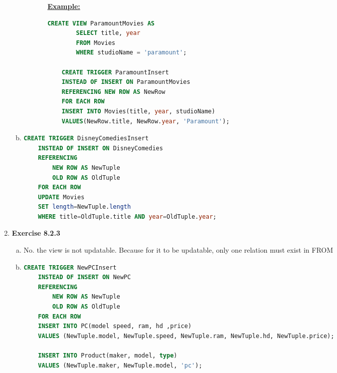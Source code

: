 \documentclass[12pt]{article}
\begin{document}
\begin{enumerate}[1.]
\begin{enumerate}[a)]
\begin{itemize}
\begin{itemize}
                \bigskip

                \underline{\textbf{Example:}}

    \begin{lstlisting}[language=SQL]
    CREATE VIEW ParamountMovies AS
        SELECT title, year
        FROM Movies
        WHERE studioName = 'paramount';

    CREATE TRIGGER ParamountInsert
    INSTEAD OF INSERT ON ParamountMovies
    REFERENCING NEW ROW AS NewRow
    FOR EACH ROW
    INSERT INTO Movies(title, year, studioName)
    VALUES(NewRow.title, NewRow.year, 'Paramount');
    \end{lstlisting}

            \end{itemize}
        \end{itemize}

        \item

    \begin{lstlisting}[language=SQL]
    CREATE TRIGGER DisneyComediesInsert
    INSTEAD OF INSERT ON DisneyComedies
    REFERENCING
        NEW ROW AS NewTuple
        OLD ROW AS OldTuple
    FOR EACH ROW
    UPDATE Movies
    SET length=NewTuple.length
    WHERE title=OldTuple.title AND year=OldTuple.year;
    \end{lstlisting}

    \end{enumerate}

    \item \textbf{Exercise 8.2.3}

    \bigskip

    \begin{enumerate}[a)]
        \item No. the view is not updatable. Because for it to be updatable,
        only one relation must exist in FROM
        \item

    \begin{lstlisting}[language=SQL]
    CREATE TRIGGER NewPCInsert
    INSTEAD OF INSERT ON NewPC
    REFERENCING
        NEW ROW AS NewTuple
        OLD ROW AS OldTuple
    FOR EACH ROW
    INSERT INTO PC(model speed, ram, hd ,price)
    VALUES (NewTuple.model, NewTuple.speed, NewTuple.ram, NewTuple.hd, NewTuple.price);

    INSERT INTO Product(maker, model, type)
    VALUES (NewTuple.maker, NewTuple.model, 'pc');
    \end{lstlisting}


\end{enumerate}
\end{enumerate}
\end{document}
